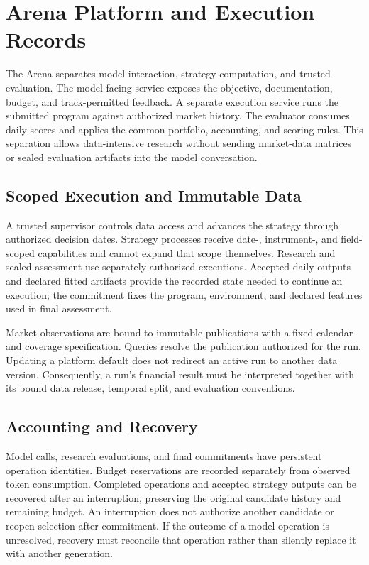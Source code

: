 \section{Arena Platform and Execution Records}
\label{app:platform}

The Arena separates model interaction, strategy computation, and trusted evaluation. The model-facing service exposes the objective, documentation, budget, and track-permitted feedback. A separate execution service runs the submitted program against authorized market history. The evaluator consumes daily scores and applies the common portfolio, accounting, and scoring rules. This separation allows data-intensive research without sending market-data matrices or sealed evaluation artifacts into the model conversation.

\subsection{Scoped Execution and Immutable Data}

A trusted supervisor controls data access and advances the strategy through authorized decision dates. Strategy processes receive date-, instrument-, and field-scoped capabilities and cannot expand that scope themselves. Research and sealed assessment use separately authorized executions. Accepted daily outputs and declared fitted artifacts provide the recorded state needed to continue an execution; the commitment fixes the program, environment, and declared features used in final assessment.

Market observations are bound to immutable publications with a fixed calendar and coverage specification. Queries resolve the publication authorized for the run. Updating a platform default does not redirect an active run to another data version. Consequently, a run's financial result must be interpreted together with its bound data release, temporal split, and evaluation conventions.

\subsection{Accounting and Recovery}

Model calls, research evaluations, and final commitments have persistent operation identities. Budget reservations are recorded separately from observed token consumption. Completed operations and accepted strategy outputs can be recovered after an interruption, preserving the original candidate history and remaining budget. An interruption does not authorize another candidate or reopen selection after commitment. If the outcome of a model operation is unresolved, recovery must reconcile that operation rather than silently replace it with another generation.

